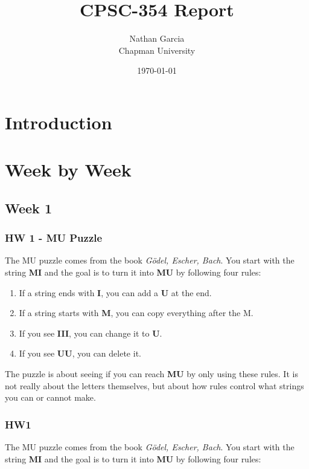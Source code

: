 \documentclass{article}
\title{CPSC-354 Report}
\author{Nathan Garcia  \\ Chapman University}
\date{\today}
\theoremstyle{theorem}
\theoremstyle{definition}
\theoremstyle{remark}
\begin{document}
\maketitle

\begin{abstract}
\end{abstract}

\setcounter{tocdepth}{3}
\tableofcontents

\section{Introduction}\label{intro}

\section{Week by Week}\label{homework}

\subsection{Week 1}
\subsubsection{HW 1 - MU Puzzle}

The MU puzzle comes from the book \textit{Gödel, Escher, Bach}. You start with the string \textbf{MI} and the goal is to turn it into \textbf{MU} by following four rules:

\begin{enumerate}
    \item If a string ends with \textbf{I}, you can add a \textbf{U} at the end.  
    \item If a string starts with \textbf{M}, you can copy everything after the M.  
    \item If you see \textbf{III}, you can change it to \textbf{U}.  
    \item If you see \textbf{UU}, you can delete it.  
\end{enumerate}

The puzzle is about seeing if you can reach \textbf{MU} by only using these rules. It is not really about the letters themselves, but about how rules control what strings you can or cannot make.
\subsubsection{HW1}

The MU puzzle comes from the book \textit{Gödel, Escher, Bach}. You start with the string \textbf{MI} and the goal is to turn it into \textbf{MU} by following four rules:
\end{document}
